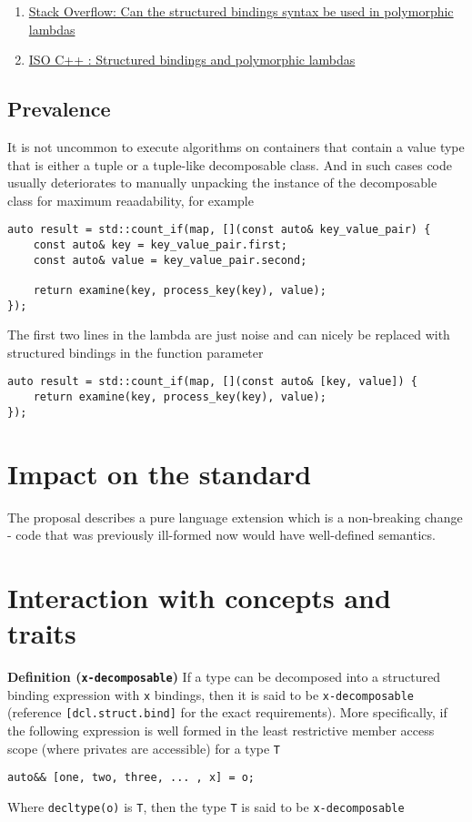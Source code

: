 \documentclass{article}
\begin{document}
\begin{enumerate}
    \item \href{https://stackoverflow.com/questions/45541334}{Stack Overflow:
        Can the structured bindings syntax be used in polymorphic lambdas}
    \item \href{https://goo.gl/fRSwNg}{ISO C++ : Structured bindings and
        polymorphic lambdas}
\end{enumerate}

\subsection{Prevalence}
It is not uncommon to execute algorithms on containers that contain a value
type that is either a tuple or a tuple-like decomposable class.  And in such
cases code usually deteriorates to manually unpacking the instance of the
decomposable class for maximum reaadability, for example

\begin{lstlisting}
auto result = std::count_if(map, [](const auto& key_value_pair) {
    const auto& key = key_value_pair.first;
    const auto& value = key_value_pair.second;

    return examine(key, process_key(key), value);
});
\end{lstlisting}

The first two lines in the lambda are just noise and can nicely be replaced
with structured bindings in the function parameter

\begin{lstlisting}
auto result = std::count_if(map, [](const auto& [key, value]) {
    return examine(key, process_key(key), value);
});
\end{lstlisting}


\section{Impact on the standard}
The proposal describes a pure language extension which is a non-breaking
change - code that was previously ill-formed now would have well-defined
semantics.


\section{Interaction with concepts and traits}
\textbf{Definition (\texttt{x-decomposable})} If a type can be decomposed into
a structured binding expression with \texttt{x} bindings, then it is said to
be \texttt{x-decomposable} (reference \texttt{[dcl.struct.bind]} for the exact
requirements).  More specifically, if the following expression is well formed
in the least restrictive member access scope (where privates are accessible)
for a type \texttt{T}
\begin{lstlisting}
auto&& [one, two, three, ... , x] = o;
\end{lstlisting}
Where \texttt{decltype(o)} is \texttt{T}, then the type \texttt{T} is said to
be \texttt{x-decomposable}
\end{document}
